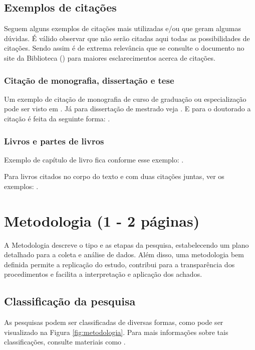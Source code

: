 \estrutura\subsection{\esp Exemplos de citações}\instrucao 

Seguem alguns exemplos de citações mais utilizadas e/ou que geram algumas dúvidas. É válido observar que não serão citadas aqui
todas as possibilidades de citações. Sendo assim é de extrema relevância que se consulte o documento no site da Biblioteca () para maiores esclarecimentos acerca de citações.

\estrutura\subsubsection{\esp Citação de monografia, dissertação e tese}\instrucao

Um exemplo de citação de monografia de curso de graduação ou especialização pode ser visto em .
Já para dissertação de mestrado veja . E para o doutorado a citação é feita da seguinte forma: . 



\estrutura\subsubsection{\esp Livros e partes de livros}\instrucao

Exemplo de capítulo de livro fica conforme esse exemplo: .

Para livros citados no corpo do texto e com duas citações juntas, ver os exemplos: .

\fi

\iffalse
\newpage

\estrutura\section{\esp Metodologia (1 - 2 páginas)}\instrucao
A Metodologia descreve o tipo e as etapas da pesquisa, estabelecendo um plano detalhado para a coleta e análise de dados. Além disso, uma metodologia bem definida permite a replicação do estudo, contribui para a transparência dos procedimentos e facilita a interpretação e aplicação dos achados.

    \subsection{\esp Classificação da pesquisa}
As pesquisas podem ser classificadas de diversas formas, como pode ser visualizado na Figura \ref{fig:metodologia}. Para mais informações sobre tais classificações, consulte materiais como .

